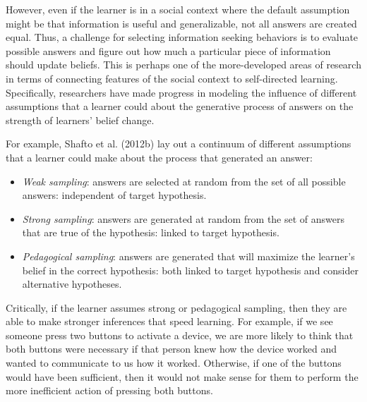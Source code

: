 \documentclass[english,floatsintext,man]{apa6}
\providecommand{\tightlist}{%
  \setlength{\itemsep}{0pt}\setlength{\parskip}{0pt}}
\theoremstyle{definition}
\theoremstyle{definition}
\theoremstyle{definition}
\theoremstyle{remark}
\begin{document}
However, even if the learner is in a social context where the default
assumption might be that information is useful and generalizable, not
all answers are created equal. Thus, a challenge for selecting
information seeking behaviors is to evaluate possible answers and figure
out how much a particular piece of information should update beliefs.
This is perhaps one of the more-developed areas of research in terms of
connecting features of the social context to self-directed learning.
Specifically, researchers have made progress in modeling the influence
of different assumptions that a learner could about the generative
process of answers on the strength of learners' belief change.

For example, Shafto et al. (2012b) lay out a continuum of different
assumptions that a learner could make about the process that generated
an answer:

\begin{itemize}
\tightlist
\item
  \emph{Weak sampling}: answers are selected at random from the set of
  all possible answers: independent of target hypothesis.
\item
  \emph{Strong sampling}: answers are generated at random from the set
  of answers that are true of the hypothesis: linked to target
  hypothesis.
\item
  \emph{Pedagogical sampling}: answers are generated that will maximize
  the learner's belief in the correct hypothesis: both linked to target
  hypothesis and consider alternative hypotheses.
\end{itemize}

\noindent
Critically, if the learner assumes strong or pedagogical sampling, then
they are able to make stronger inferences that speed learning. For
example, if we see someone press two buttons to activate a device, we
are more likely to think that both buttons were necessary if that person
knew how the device worked and wanted to communicate to us how it
worked. Otherwise, if one of the buttons would have been sufficient,
then it would not make sense for them to perform the more inefficient
action of pressing both buttons.
\end{document}
